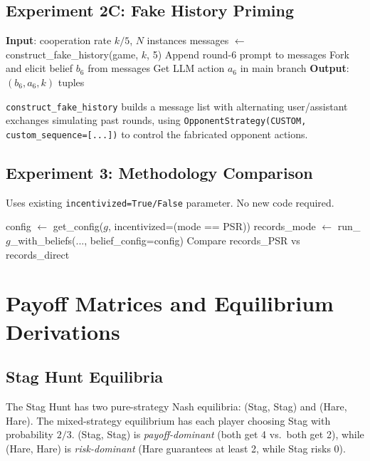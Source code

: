 \documentclass[12pt]{article}
\begin{document}
\subsection{Experiment 2C: Fake History Priming}

\begin{algorithmic}[1]
\STATE \textbf{Input}: cooperation rate $k/5$, $N$ instances
\STATE messages $\leftarrow$ construct\_fake\_history(game, $k$, 5)
\STATE Append round-6 prompt to messages
\STATE Fork and elicit belief $b_6$ from messages
\STATE Get LLM action $a_6$ in main branch
\STATE \textbf{Output}: $(b_6, a_6, k)$ tuples
\end{algorithmic}

\texttt{construct\_fake\_history} builds a message list with alternating user/assistant exchanges simulating past rounds, using \texttt{OpponentStrategy(CUSTOM, custom\_sequence=[...])} to control the fabricated opponent actions.

\subsection{Experiment 3: Methodology Comparison}

Uses existing \texttt{incentivized=True/False} parameter. No new code required.

\begin{algorithmic}[1]
    \STATE config $\leftarrow$ get\_config($g$, incentivized=(mode == PSR))
    \STATE records\_mode $\leftarrow$ run\_$g$\_with\_beliefs(..., belief\_config=config)
\ENDFOR
\STATE Compare records\_PSR vs records\_direct
\end{algorithmic}


\appendix
\section{Payoff Matrices and Equilibrium Derivations}
\label{app:payoffs}

\subsection{Stag Hunt Equilibria}

The Stag Hunt has two pure-strategy Nash equilibria: (Stag, Stag) and (Hare, Hare). The mixed-strategy equilibrium has each player choosing Stag with probability $2/3$. (Stag, Stag) is \emph{payoff-dominant} (both get 4 vs.\ both get 2), while (Hare, Hare) is \emph{risk-dominant} (Hare guarantees at least 2, while Stag risks 0).
\end{document}
